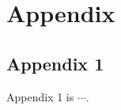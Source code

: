 \section{Appendix}\label{sec:appendix}

\subsection{Appendix 1}\label{subsec:appendix-1}

Appendix 1 is $\cdots$.
